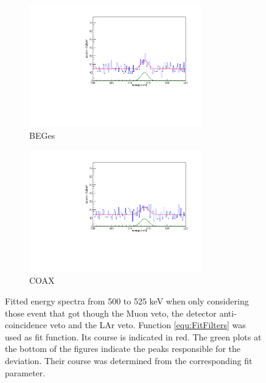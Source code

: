 \documentclass[encoding=utf8,british]{tumphthesis}
\begin{document}
\begin{figure}[t!]
	\centering
	\begin{subfigure}{.5\textwidth}
		\centering
		\includegraphics[width=75mm]{./Bilder/500525FitLArVetoBEGes.pdf}
		\caption{BEGes}
		\label{fig:FitLArVetoBEGes}
	\end{subfigure}\hfill%
	\begin{subfigure}{.5\textwidth}
		\centering
		\includegraphics[width=75mm]{./Bilder/500525FitLArVetoCOAX.pdf}
		\caption{COAX}
		\label{fig:FitLArVetoCOAX}
	\end{subfigure}
	\caption{
	Fitted energy spectra from 500 to 525 keV when only considering those event that got though the Muon veto, the detector anti-coincidence veto and the LAr veto. 
	Function \ref{equ:FitFilters} was used as fit function. 
	Its course is indicated in red. 
	The green plots at the bottom of the figures indicate the peaks responsible for the deviation. 
	Their course was determined from the corresponding fit parameter.
	}
\end{figure}
\end{document}
